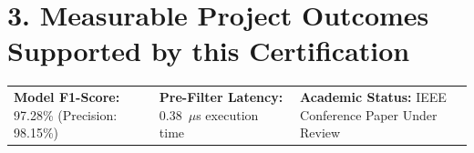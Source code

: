 \documentclass[10pt,a4paper]{article}
\begin{document}
\section*{3. Measurable Project Outcomes Supported by this Certification}
\noindent
\begin{tabularx}{\textwidth}{@{}X X X@{}}
    \textbf{Model F1-Score:} 97.28\% (Precision: 98.15\%) & 
    \textbf{Pre-Filter Latency:} 0.38~$\mu$s execution time & 
    \textbf{Academic Status:} IEEE Conference Paper Under Review \\
\end{tabularx}
\end{document}
